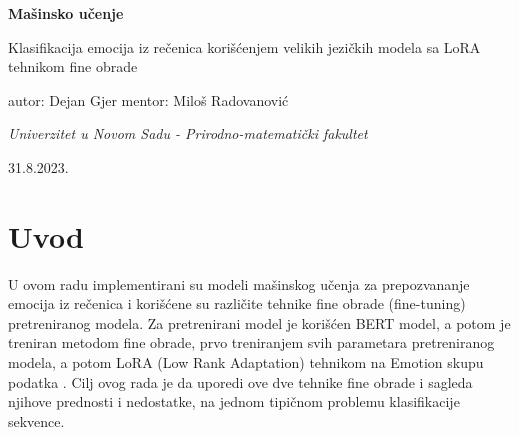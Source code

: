 \documentclass{article}
\theoremstyle{definition}
\begin{document}
	
	\begin{titlepage}
		\centering
		{\LARGE\bfseries Mašinsko učenje}
		
		\vspace{1cm}
		
		{\LARGE Klasifikacija emocija iz rečenica korišćenjem velikih jezičkih 
        modela sa LoRA tehnikom fine obrade}
		
		\vspace{2cm}
		
		\vfill
		
		{\large 
			\begin{flushleft}
				autor: Dejan Gjer
				\hfill
				mentor: Miloš Radovanović
			\end{flushleft}
		}
		
		
		\vspace{1cm}
		
		{\itshape Univerzitet u Novom Sadu - Prirodno-matematički fakultet}
		
		\vspace{0.3cm}
		
		31.8.2023.
		
		
	\end{titlepage}
	
	\newpage
	
	\tableofcontents
	
	\newpage
	
	\section{Uvod} \label{uvod}
	
	U ovom radu implementirani su modeli mašinskog učenja za prepozvananje 
    emocija iz rečenica i korišćene su različite tehnike fine obrade 
	(fine-tuning) pretreniranog modela. Za pretrenirani model je korišćen BERT
	\cite{bert} model, a potom je treniran metodom fine obrade, prvo treniranjem
	svih parametara pretreniranog modela, a potom LoRA (Low Rank Adaptation)
	tehnikom \cite{lora} na Emotion skupu podatka \cite{emotion-dataset}. 
	Cilj ovog rada je da uporedi ove dve tehnike 
	fine obrade i sagleda njihove prednosti i nedostatke, na jednom tipičnom
	problemu klasifikacije sekvence.
	
\end{document}
